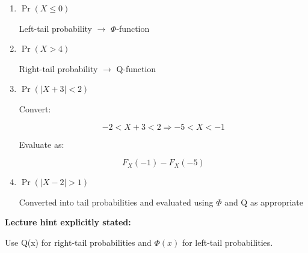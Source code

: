 \documentclass[12pt]{article}
\begin{document}
\begin{enumerate}
\item $\Pr(X \le 0)$

Left-tail probability $\rightarrow$ $\Phi$-function

\item $\Pr(X > 4)$

Right-tail probability $\rightarrow$ Q-function

\item $\Pr(|X + 3| < 2)$

Convert:

\[
-2 < X + 3 < 2 \Rightarrow -5 < X < -1
\]

Evaluate as:

\[
F_X(-1) - F_X(-5)
\]

\item $\Pr(|X - 2| > 1)$

Converted into tail probabilities and evaluated using $\Phi$ and Q as appropriate
\end{enumerate}

\textbf{Lecture hint explicitly stated:}

Use Q(x) for right-tail probabilities and $\Phi(x)$ for left-tail probabilities.
\end{document}
